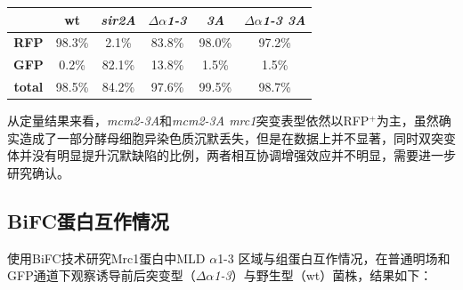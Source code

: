 \documentclass[a4,10pt]{article}
\begin{document}
\begin{table}[H]
    \centering
    \begin{tabular}{|c|c|c|c|c|c|}
        \hline
         & \textbf{wt} & \textbf{\textit{sir2A}} & \textbf{$\Delta \alpha$\textit{1-3}} & \textbf{\textit{3A}} & \textbf{$\Delta\alpha$\textit{1-3 3A}} \\
        \hline
        \textbf{RFP} & 98.3\% & 2.1\% & 83.8\% & 98.0\% & 97.2\%  \\
        \hline
        \textbf{GFP} & 0.2\% & 82.1\% & 13.8\% & 1.5\% & 1.5\% \\
        \hline
        \textbf{total} & 98.5\% & 84.2\% & 97.6\% & 99.5\% & 98.7\% \\
        \hline
    \end{tabular}
\end{table}

从定量结果来看，\textit{mcm2-3A}和\textit{mcm2-3A mrc1}突变表型依然以RFP$^+$为主，虽然确实造成了一部分酵母细胞异染色质沉默丢失，但是在数据上并不显著，同时双突变体并没有明显提升沉默缺陷的比例，两者相互协调增强效应并不明显，需要进一步研究确认。

\subsection{BiFC蛋白互作情况}
使用BiFC技术研究Mrc1蛋白中MLD $\alpha$1-3 区域与组蛋白互作情况，在普通明场和GFP通道下观察诱导前后突变型（$\Delta \alpha$\textit{1-3}）与野生型（wt）菌株，结果如下：
\end{document}
